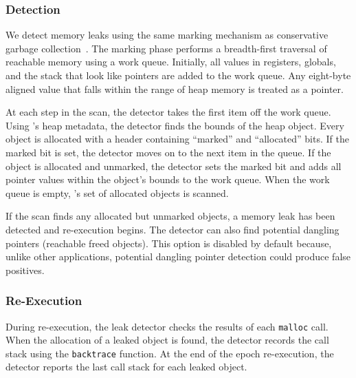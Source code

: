 \subsubsection*{Detection}

We detect memory leaks using the same marking mechanism as conservative garbage collection~\cite{Wilson:1992:UGC:645648.664824}. The marking phase performs a breadth-first traversal of reachable memory using a work queue. Initially, all values in registers, globals, and the stack that look like pointers are added to the work queue. Any eight-byte aligned value that falls within the range of heap memory is treated as a pointer.

At each step in the scan, the detector takes the first item off the work queue. Using \doubletake{}'s heap metadata, the detector finds the bounds of the heap object. Every object is allocated with a header containing ``marked'' and ``allocated'' bits. If the marked bit is set, the detector moves on to the next item in the queue. If the object is allocated and unmarked, the detector sets the marked bit and adds all pointer values within the object's bounds to the work queue. When the work queue is empty, \doubletake{}'s set of allocated objects is scanned.

If the scan finds any allocated but unmarked objects, a memory leak has been detected and re-execution begins. The detector can also find potential dangling pointers (reachable freed objects). This option is disabled by default because, unlike other applications, potential dangling pointer detection could produce false positives.

\subsubsection*{Re-Execution}

During re-execution, the leak detector checks the results of each \texttt{malloc} call. When the allocation of a leaked object is found, the detector records the call stack using the \texttt{backtrace} function. At the end of the epoch re-execution, the detector reports the last call stack for each leaked object.
